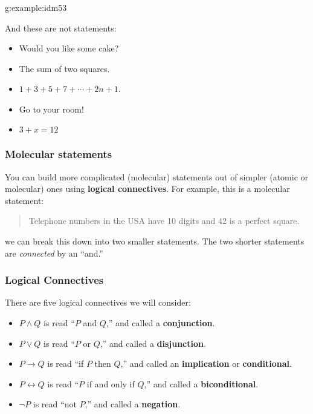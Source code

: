 \documentclass[11pt, compress]{beamer}
\newcommand{\terminology}[1]{\textbf{#1}}\newcommand{\lt}{<}
\renewcommand{\iff}{\leftrightarrow}
\newcommand{\imp}{\rightarrow}
\begin{document}
\begin{frame}
\frametitle{}
\begin{example}{}{g:example:idm53}%

And these are not statements:\begin{itemize}
\item{}
Would you like some cake?

\item{}
The sum of two squares.

\item{}\(1+3+5+7+\cdots+2n+1\).

\item{}
Go to your room!

\item{}
\(3+x = 12\)
\end{itemize}\end{example}
\end{frame}
 
\begin{frame}
\frametitle{Molecular statements}
 
You can build more complicated (molecular) statements out of simpler (atomic or molecular) ones using \terminology{logical connectives}. For example, this is a molecular statement: \begin{quote}%

Telephone numbers in the USA have 10 digits and 42 is a perfect square.\end{quote}
 
we can break this down into two smaller statements. The two shorter statements are \emph{connected} by an ``and.''\end{frame}
 
\begin{frame}
\frametitle{Logical Connectives}
 
There are five logical connectives we will consider:\pause 
\begin{itemize}[<+->]
\item{}\(P \wedge Q\) is read ``\(P\) and \(Q\),'' and called a \terminology{conjunction}.

\item{}\(P \vee Q\) is read ``\(P\) or \(Q\),'' and called a \terminology{disjunction}.

\item{}\(P \imp Q\) is read ``if \(P\) then \(Q\),'' and called an \terminology{implication} or \terminology{conditional}.

\item{}\(P \iff Q\) is read ``\(P\) if and only if \(Q\),'' and called a \terminology{biconditional}.

\item{}\(\neg P\) is read ``not \(P\),'' and called a \terminology{negation}.
\end{itemize}\end{frame}
 
\end{document}
